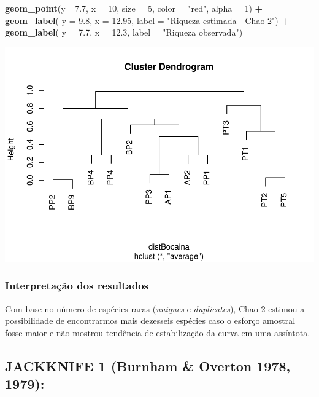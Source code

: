 \documentclass[
]{book}
\newenvironment{Shaded}{\begin{snugshade}}{\end{snugshade}}
\newcommand{\DataTypeTok}[1]{\textcolor[rgb]{0.13,0.29,0.53}{#1}}
\newcommand{\DecValTok}[1]{\textcolor[rgb]{0.00,0.00,0.81}{#1}}
\newcommand{\FloatTok}[1]{\textcolor[rgb]{0.00,0.00,0.81}{#1}}
\newcommand{\KeywordTok}[1]{\textcolor[rgb]{0.13,0.29,0.53}{\textbf{#1}}}
\newcommand{\NormalTok}[1]{#1}
\newcommand{\OperatorTok}[1]{\textcolor[rgb]{0.81,0.36,0.00}{\textbf{#1}}}
\newcommand{\StringTok}[1]{\textcolor[rgb]{0.31,0.60,0.02}{#1}}
\begin{document}
\begin{Shaded}
\begin{Highlighting}[]
\StringTok{  }\KeywordTok{geom_point}\NormalTok{(}\DataTypeTok{y=} \FloatTok{7.7}\NormalTok{, }\DataTypeTok{x =} \DecValTok{10}\NormalTok{, }\DataTypeTok{size =} \DecValTok{5}\NormalTok{, }\DataTypeTok{color =} \StringTok{"red"}\NormalTok{, }\DataTypeTok{alpha =} \DecValTok{1}\NormalTok{) }\OperatorTok{+}\StringTok{ }
\StringTok{  }\KeywordTok{geom_label}\NormalTok{( }\DataTypeTok{y =} \FloatTok{9.8}\NormalTok{, }\DataTypeTok{x =} \FloatTok{12.95}\NormalTok{, }\DataTypeTok{label =} \StringTok{"Riqueza estimada - Chao 2"}\NormalTok{) }\OperatorTok{+}
\StringTok{  }\KeywordTok{geom_label}\NormalTok{( }\DataTypeTok{y =} \FloatTok{7.7}\NormalTok{, }\DataTypeTok{x =} \FloatTok{12.3}\NormalTok{, }\DataTypeTok{label =} \StringTok{"Riqueza observada"}\NormalTok{)}
\end{Highlighting}
\end{Shaded}

\includegraphics{livro_r_ecologia_files/figure-latex/unnamed-chunk-25-1.pdf}

\hypertarget{interpretauxe7uxe3o-dos-resultados-2}{%
\subsubsection{Interpretação dos resultados}\label{interpretauxe7uxe3o-dos-resultados-2}}

Com base no número de espécies raras (\emph{uniques} e \emph{duplicates}), Chao 2 estimou a possibilidade de encontrarmos mais dezesseis espécies caso o esforço amostral fosse maior e não mostrou tendência de estabilização da curva em uma assíntota.

\hypertarget{jackknife-1-burnham-overton-1978-1979}{%
\subsection{JACKKNIFE 1 (Burnham \& Overton 1978, 1979):}\label{jackknife-1-burnham-overton-1978-1979}}
\end{document}

